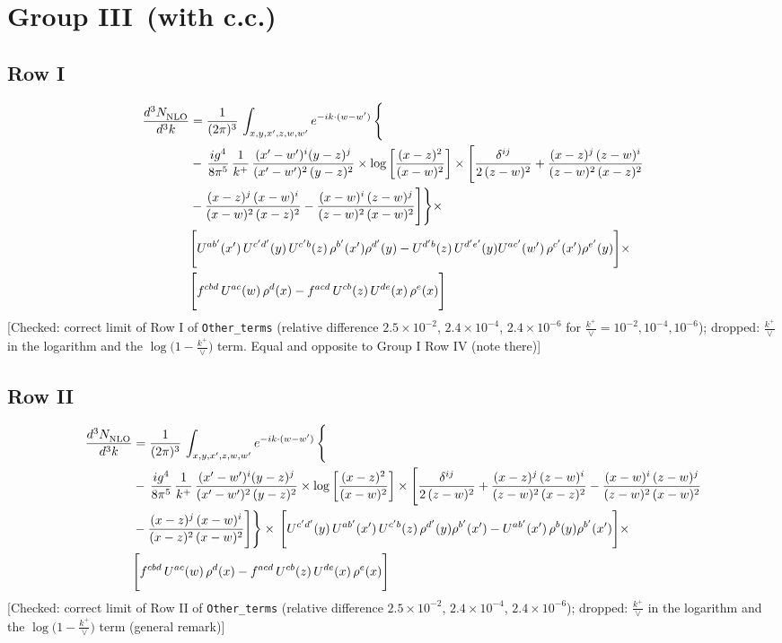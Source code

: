 \documentclass[9pt]{article}
\numberwithin{equation}{section}
\begin{document}
\section{Group III\, (with c.c.)}
\subsection{Row I}
\begin{align}
     \frac{d^{3}N_{\rm NLO}^{\rm}}{d^{3}k}  & =   \frac{1}{(2\pi)^{3}}\, \int_{x,y,x',z,w,w^{\prime}} e^{-ik\cdot (w-w')}\, \Bigg\{\notag \\
& -\,\frac{ig^{4}}{8\pi^{5}}\,\frac{1}{k^{+}}\,\frac{(x'-w')^{i}(y-z)^{j}}{(x'-w')^{2}\,(y-z)^{2}}\times \log{\left[\frac{(x-z)^{2}}{(x-w)^{2}}\right]}\times \Bigg[\frac{\delta^{ij}}{2\,(z-w)^{2}}+\frac{(x-z)^{j}\,(z-w)^{i}}{(z-w)^{2}\,(x-z)^{2}}\notag \\ & -\frac{(x-z)^{j}\,(x-w)^{i}}{(x-w)^{2}\,(x-z)^{2}}-\frac{(x-w)^{i}\,(z-w)^{j}}{(z-w)^{2}\,(x-w)^{2}}\Bigg]\Bigg\}\times \notag \\ &  \Bigg[U^{ab'}(x')\,U^{c'd'}(y)\,U^{c'b}(z)\,\rho^{b'}(x')\rho^{d'}(y)-U^{d'b}(z)\,U^{d'e'}(y)U^{ac'}(w')\,\rho^{c'}(x')\rho^{e'}(y)\Bigg]\times\notag \\ & \Bigg[f^{cbd}\,U^{ac}(w)\,\rho^{d}(x)-f^{acd}\, U^{cb}(z)\,U^{de}(x)\,\rho^{e}(x)\Bigg]
\end{align} {\color{red}[Checked: correct limit of Row I of \texttt{Other\_terms} (relative difference $2.5\times10^{-2}$, $2.4\times10^{-4}$, $2.4\times10^{-6}$ for $\frac{k^{+}}{\vee}=10^{-2},10^{-4},10^{-6}$); dropped: $\frac{k^{+}}{\vee}$ in the logarithm and the $\log\big(1-\frac{k^{+}}{\vee}\big)$ term. Equal and opposite to Group I Row IV (note there)]}\par\noindent
\subsection{Row II}
\begin{align}
     \frac{d^{3}N_{\rm NLO}^{\rm}}{d^{3}k}  & =   \frac{1}{(2\pi)^{3}}\, \int_{x,y,x',z,w,w^{\prime}} e^{-ik\cdot (w-w')}\, \Bigg\{\notag \\
& -\,\frac{ig^{4}}{8\pi^{5}}\,\frac{1}{k^{+}}\,\frac{(x'-w')^{i}(y-z)^{j}}{(x'-w')^{2}\,(y-z)^{2}}\times \log{\left[\frac{(x-z)^{2}}{(x-w)^{2}}\right]}\times \Bigg[\frac{\delta^{ij}}{2\,(z-w)^{2}}+\frac{(x-z)^{j}\,(z-w)^{i}}{(z-w)^{2}\,(x-z)^{2}} -\frac{(x-w)^{i}\,(z-w)^{j}}{(z-w)^{2}\,(x-w)^{2}}\notag \\ & -\frac{(x-z)^{j}\,(x-w)^{i}}{(x-z)^{2}\,(x-w)^{2}}\Bigg]\Bigg\}\times\,\Bigg[U^{c'd'}(y)\,U^{ab'}(x')\,U^{c'b}(z)\,\rho^{d'}(y)\rho^{b'}(x')-U^{ab'}(x')\,\rho^{b}(y)\rho^{b'}(x')\Bigg]\times\notag \\ & \Bigg[f^{cbd}\,U^{ac}(w)\,\rho^{d}(x)-f^{acd}\, U^{cb}(z)\,U^{de}(x)\,\rho^{e}(x)\Bigg]
\end{align} {\color{red}[Checked: correct limit of Row II of \texttt{Other\_terms} (relative difference $2.5\times10^{-2}$, $2.4\times10^{-4}$, $2.4\times10^{-6}$); dropped: $\frac{k^{+}}{\vee}$ in the logarithm and the $\log\big(1-\frac{k^{+}}{\vee}\big)$ term (general remark)]}\par\noindent
\end{document}
